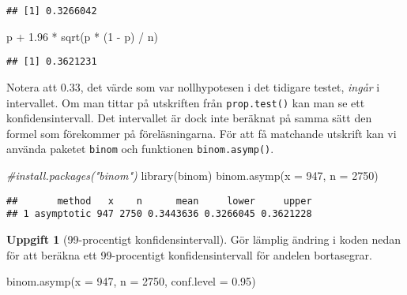 \documentclass[
]{book}
\newenvironment{Shaded}{\begin{snugshade}}{\end{snugshade}}
\newcommand{\AttributeTok}[1]{\textcolor[rgb]{0.77,0.63,0.00}{#1}}
\newcommand{\CommentTok}[1]{\textcolor[rgb]{0.56,0.35,0.01}{\textit{#1}}}
\newcommand{\DecValTok}[1]{\textcolor[rgb]{0.00,0.00,0.81}{#1}}
\newcommand{\FloatTok}[1]{\textcolor[rgb]{0.00,0.00,0.81}{#1}}
\newcommand{\FunctionTok}[1]{\textcolor[rgb]{0.00,0.00,0.00}{#1}}
\newcommand{\NormalTok}[1]{#1}
\newcommand{\SpecialCharTok}[1]{\textcolor[rgb]{0.00,0.00,0.00}{#1}}
\theoremstyle{definition}
\theoremstyle{definition}
\theoremstyle{definition}
\newtheorem{exercise}{Uppgift}[chapter]
\theoremstyle{definition}
\theoremstyle{remark}
\begin{document}
\begin{verbatim}
## [1] 0.3266042
\end{verbatim}

\begin{Shaded}
\begin{Highlighting}[]
\NormalTok{p }\SpecialCharTok{+} \FloatTok{1.96} \SpecialCharTok{*} \FunctionTok{sqrt}\NormalTok{(p }\SpecialCharTok{*}\NormalTok{ (}\DecValTok{1} \SpecialCharTok{{-}}\NormalTok{ p) }\SpecialCharTok{/}\NormalTok{ n)}
\end{Highlighting}
\end{Shaded}

\begin{verbatim}
## [1] 0.3621231
\end{verbatim}

Notera att 0.33, det värde som var nollhypotesen i det tidigare testet, \emph{ingår} i intervallet. Om man tittar på utskriften från \texttt{prop.test()} kan man se ett konfidensintervall. Det intervallet är dock inte beräknat på samma sätt den formel som förekommer på föreläsningarna. För att få matchande utskrift kan vi använda paketet \texttt{binom} och funktionen \texttt{binom.asymp()}.

\begin{Shaded}
\begin{Highlighting}[]
\CommentTok{\#install.packages("binom")}
\FunctionTok{library}\NormalTok{(binom)}
\FunctionTok{binom.asymp}\NormalTok{(}\AttributeTok{x =} \DecValTok{947}\NormalTok{, }\AttributeTok{n =} \DecValTok{2750}\NormalTok{)}
\end{Highlighting}
\end{Shaded}

\begin{verbatim}
##       method   x    n      mean     lower     upper
## 1 asymptotic 947 2750 0.3443636 0.3266045 0.3621228
\end{verbatim}

\begin{exercise}[99-procentigt konfidensintervall]

Gör lämplig ändring i koden nedan för att beräkna ett 99-procentigt konfidensintervall för andelen bortasegrar.

\begin{Shaded}
\begin{Highlighting}[]
\FunctionTok{binom.asymp}\NormalTok{(}\AttributeTok{x =} \DecValTok{947}\NormalTok{, }\AttributeTok{n =} \DecValTok{2750}\NormalTok{, }\AttributeTok{conf.level =} \FloatTok{0.95}\NormalTok{)}
\end{Highlighting}
\end{Shaded}

\end{exercise}
\end{document}
